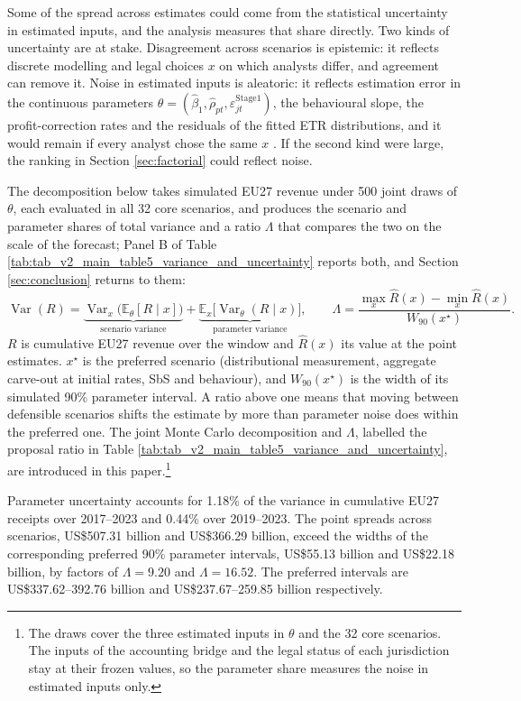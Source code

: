 \documentclass[11pt,a4paper]{article}
\newcommand{\usd}{US\$}
\begin{document}
Some of the spread across estimates could come from the statistical uncertainty in estimated inputs, and the analysis measures that share directly. Two kinds of uncertainty are at stake. Disagreement across scenarios is epistemic: it reflects discrete modelling and legal choices $x$ on which analysts differ, and agreement can remove it. Noise in estimated inputs is aleatoric: it reflects estimation error in the continuous parameters $\theta=(\hat\beta_1,\hat\rho_{pt},\varepsilon^{\mathrm{Stage1}}_{jt})$, the behavioural slope, the profit-correction rates and the residuals of the fitted ETR distributions, and it would remain if every analyst chose the same $x$ \citep{hullermeier2021}. If the second kind were large, the ranking in Section \ref{sec:factorial} could reflect noise.

The decomposition below takes simulated EU27 revenue under 500 joint draws of $\theta$, each evaluated in all 32 core scenarios, and produces the scenario and parameter shares of total variance and a ratio $\Lambda$ that compares the two on the scale of the forecast; Panel B of Table \ref{tab:tab_v2_main_table5_variance_and_uncertainty} reports both, and Section \ref{sec:conclusion} returns to them:
\begin{equation}\label{eq:totalvariance}
\operatorname{Var}(R)=\underbrace{\operatorname{Var}_x\!\bigl(\mathbb{E}_\theta[R\mid x]\bigr)}_{\text{scenario variance}}+\underbrace{\mathbb{E}_x\!\bigl[\operatorname{Var}_\theta(R\mid x)\bigr]}_{\text{parameter variance}},\qquad
\Lambda=\frac{\max_x\hat R(x)-\min_x\hat R(x)}{W_{90}(x^{\star})}.
\end{equation}
$R$ is cumulative EU27 revenue over the window and $\hat R(x)$ its value at the point estimates. $x^{\star}$ is the preferred scenario (distributional measurement, aggregate carve-out at initial rates, SbS and behaviour), and $W_{90}(x^{\star})$ is the width of its simulated 90\% parameter interval. A ratio above one means that moving between defensible scenarios shifts the estimate by more than parameter noise does within the preferred one. The joint Monte Carlo decomposition and $\Lambda$, labelled the proposal ratio in Table \ref{tab:tab_v2_main_table5_variance_and_uncertainty}, are introduced in this paper.\footnote{The draws cover the three estimated inputs in $\theta$ and the 32 core scenarios. The inputs of the accounting bridge and the legal status of each jurisdiction stay at their frozen values, so the parameter share measures the noise in estimated inputs only.}

Parameter uncertainty accounts for 1.18\% of the variance in cumulative EU27 receipts over 2017–2023 and 0.44\% over 2019–2023. The point spreads across scenarios, \usd507.31 billion and \usd366.29 billion, exceed the widths of the corresponding preferred 90\% parameter intervals, \usd55.13 billion and \usd22.18 billion, by factors of $\Lambda=9.20$ and $\Lambda=16.52$. The preferred intervals are \usd337.62–392.76 billion and \usd237.67–259.85 billion respectively.
\end{document}
